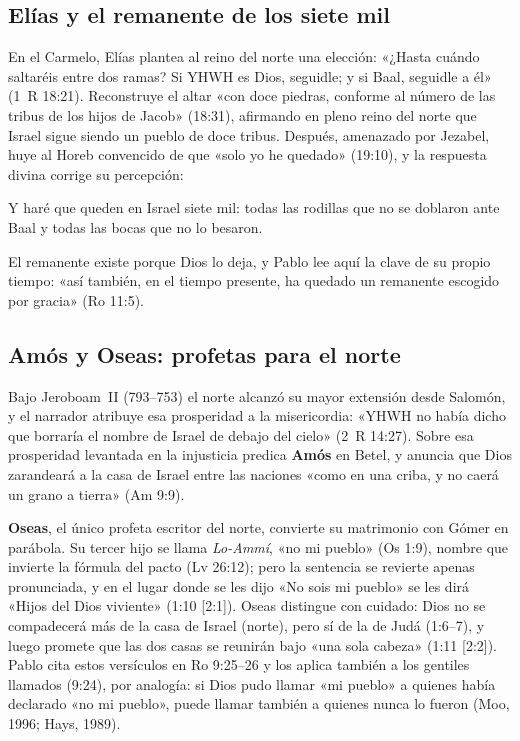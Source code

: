 \subsection{Elías y el remanente de los siete mil}
En el Carmelo, Elías plantea al reino del norte una elección: «¿Hasta cuándo saltaréis entre dos ramas? Si YHWH es Dios, seguidle; y si Baal, seguidle a él» (1~R 18:21). Reconstruye el altar «con doce piedras, conforme al número de las tribus de los hijos de Jacob» (18:31), afirmando en pleno reino del norte que Israel sigue siendo un pueblo de doce tribus. Después, amenazado por Jezabel, huye al Horeb convencido de que «solo yo he quedado» (19:10), y la respuesta divina corrige su percepción:
\begin{cita}Y haré que queden en Israel siete mil: todas las rodillas que no se doblaron ante Baal y todas las bocas que no lo besaron.\end{cita}
El remanente existe porque Dios lo deja, y Pablo lee aquí la clave de su propio tiempo: «así también, en el tiempo presente, ha quedado un remanente escogido por gracia» (Ro 11:5).

\subsection{Amós y Oseas: profetas para el norte}
Bajo Jeroboam~II (793--753) el norte alcanzó su mayor extensión desde Salomón, y el narrador atribuye esa prosperidad a la misericordia: «YHWH no había dicho que borraría el nombre de Israel de debajo del cielo» (2~R 14:27). Sobre esa prosperidad levantada en la injusticia predica \textbf{Amós} en Betel, y anuncia que Dios zarandeará a la casa de Israel entre las naciones «como en una criba, y no caerá un grano a tierra» (Am 9:9).

\textbf{Oseas}, el único profeta escritor del norte, convierte su matrimonio con Gómer en parábola. Su tercer hijo se llama \emph{Lo-Ammí}, «no mi pueblo» (Os 1:9), nombre que invierte la fórmula del pacto (Lv 26:12); pero la sentencia se revierte apenas pronunciada, y en el lugar donde se les dijo «No sois mi pueblo» se les dirá «Hijos del Dios viviente» (1:10 [2:1]). Oseas distingue con cuidado: Dios no se compadecerá más de la casa de Israel (norte), pero sí de la de Judá (1:6--7), y luego promete que las dos casas se reunirán bajo «una sola cabeza» (1:11 [2:2]). Pablo cita estos versículos en Ro 9:25--26 y los aplica también a los gentiles llamados (9:24), por analogía: si Dios pudo llamar «mi pueblo» a quienes había declarado «no mi pueblo», puede llamar también a quienes nunca lo fueron (Moo, 1996; Hays, 1989).

